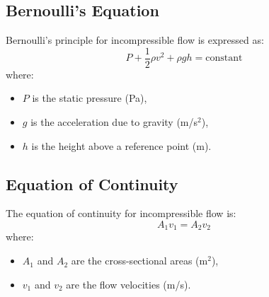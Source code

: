 \subsection{Bernoulli's Equation}
Bernoulli's principle for incompressible flow is expressed as:
\begin{equation}
    P + \frac{1}{2} \rho v^2 + \rho g h = \text{constant}
\end{equation}
where:
\begin{itemize}
    \item $P$ is the static pressure (Pa),
    \item $g$ is the acceleration due to gravity (m/s\(^2\)),
    \item $h$ is the height above a reference point (m).
\end{itemize}

\subsection{Equation of Continuity}
The equation of continuity for incompressible flow is:
\begin{equation}
    A_1 v_1 = A_2 v_2
\end{equation}
where:
\begin{itemize}
    \item $A_1$ and $A_2$ are the cross-sectional areas (m\(^2\)),
    \item $v_1$ and $v_2$ are the flow velocities (m/s).
\end{itemize}